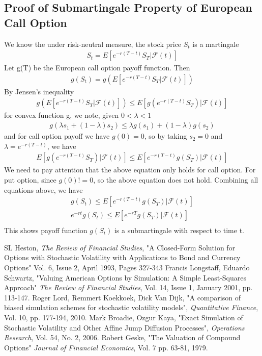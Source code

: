 \documentclass[a4paper]{article}
\begin{document}
\subsection{Proof of Submartingale Property of European Call Option}
We know the under risk-neutral measure, the stock price $S_t$ is a martingale
\begin{align*}
	S_t = E[e^{-r(T-t)}S_T | \mathcal F(t)]
\end{align*}
Let g(T) be the European call option payoff function. Then
\begin{align*}
	g(S_t) = g(E[e^{-r(T-t)}S_T | \mathcal F(t)])
\end{align*}
By Jensen's inequality
\begin{align*}
	g(E[e^{-r(T-t)}S_T | \mathcal F(t)]) \leq E[g(e^{-r(T-t)}S_T)| \mathcal F(t)]
\end{align*}
for convex function g, we note, given $0 < \lambda < 1$
\begin{align*}
	g(\lambda s_1 + (1 - \lambda) s_2 ) \leq \lambda g(s_1) + (1 - \lambda)g(s_2)
\end{align*}
	and for call option payoff we have $g(0) = 0$, so by taking $s_2 = 0$ and $\lambda = e^{-r(T-t)}$, we have
\begin{align*}
	E[g(e^{-r(T-t)}S_T)| \mathcal F(t)] \leq E[e^{-r(T-t)}g(S_T) | \mathcal F(t)]
\end{align*}
We need to pay attention that the above equation only holds for call option. For put option, since $g(0) != 0$, so the above equation does not hold.
Combining all equations above, we have
\begin{align*}
	g(S_t) \leq E[e^{-r(T-t)}g(S_T) | \mathcal F(t)]\\
	e^{-rt}g(S_t) \leq E[e^{-rT}g(S_T)| \mathcal F(t)]\\
\end{align*}
	This shows payoff function $g(S_t)$ is a submartingale with respect to time t.
\begin{thebibliography}{9}
		SL Heston,
		\textit{The Review of Financial Studies},
		"A Closed-Form Solution for Options with Stochastic Volatility with Applications 
		to Bond and Currency Options"
		Vol. 6, Issue 2, April 1993, Pages 327-343
		Francis Longstaff, Eduardo Schwartz, 
		"Valuing American Options by Simulation: A Simple Least-Squares Approach"
		\textit{The Review of Financial Studies}, 
		Vol. 14, Issue 1, January 2001, pp. 113-147.
		Roger Lord, Remmert Koekkoek, Dick Van Dijk, 
		"A comparison of biased simulation schemes for stochastic volatility models", 
		\textit{Quantitative Finance}, 
		Vol. 10, pp. 177-194, 2010.
		Mark Broadie, Ozgur Kaya,
		"Exact Simulation of Stochastic Volatility and Other Affine Jump Diffusion Processes",
		\textit{Operations Research},
		Vol. 54, No. 2, 2006.
		Robert Geske,
		"The Valuation of Compound Options"
		\textit{Journal of Financial Economics},
		Vol. 7 pp. 63-81, 1979.
\end{thebibliography}
\end{document}
